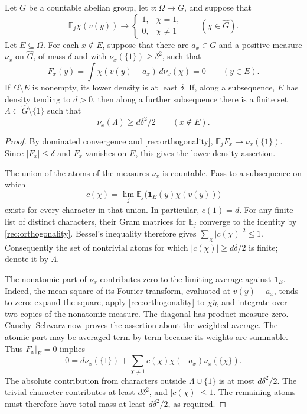 \begin{lemma}\label{rec:spectral-concentration}
Let \(G\) be a countable abelian group, let \(v:\Omega\to G\), and suppose
that
\begin{equation}\label{rec:orthogonality}
 \mathbb E_j\chi(v(y))\longrightarrow
 \begin{cases}1,&\chi=1,\\0,&\chi\ne1\end{cases}
 \qquad(\chi\in\widehat G).
\end{equation}
Let \(E\subseteq\Omega\).  For each \(x\notin E\), suppose that there are
\(a_x\in G\) and a positive measure \(\nu_x\) on \(\widehat G\), of mass
\(\delta\) and with \(\nu_x(\{1\})\geq\delta^2\), such that
\[
 F_x(y)=\int\chi(v(y)-a_x)\,d\nu_x(\chi)=0
 \qquad(y\in E).
\]
If \(\Omega\setminus E\) is nonempty, its lower density is at least
\(\delta\).  If, along a subsequence, \(E\) has density tending to
\(d>0\), then along a further subsequence there is a finite set
\(\Lambda\subset\widehat G\setminus\{1\}\) such that
\begin{equation}\label{rec:finite-spectral-list}
 \nu_x(\Lambda)\geq d\delta^2/2\qquad(x\notin E).
\end{equation}
\end{lemma}

\begin{proof}
By dominated convergence and \eqref{rec:orthogonality},
\(\mathbb E_jF_x\to\nu_x(\{1\})\).  Since \(|F_x|\leq\delta\) and
\(F_x\) vanishes on \(E\), this gives the lower-density assertion.

The union of the atoms of the measures \(\nu_x\) is countable.  Pass to
a subsequence on which
\[
 c(\chi)=\lim_j\mathbb E_j
       \bigl(\boldsymbol 1_E(y)\chi(v(y))\bigr)
\]
exists for every character in that union.  In particular, \(c(1)=d\).
For any finite list of distinct characters, their Gram matrices for
\(\mathbb E_j\) converge to the identity by
\eqref{rec:orthogonality}.  Bessel's inequality therefore gives
\(\sum_\chi|c(\chi)|^2\leq1\).  Consequently the set of nontrivial atoms
for which \(|c(\chi)|\geq d\delta/2\) is finite; denote it by
\(\Lambda\).

The nonatomic part of \(\nu_x\) contributes zero to the limiting average
against \(\boldsymbol 1_E\).  Indeed, the mean square of its Fourier
transform, evaluated at \(v(y)-a_x\), tends to zero: expand the square,
apply \eqref{rec:orthogonality} to \(\chi\overline\eta\), and integrate
over two copies of the nonatomic measure.  The diagonal has product
measure zero.  Cauchy--Schwarz now proves the assertion about the weighted
average.  The atomic part may be averaged term by term because its
weights are summable.  Thus \(F_x|_E=0\) implies
\[
 0=d\nu_x(\{1\})+
   \sum_{\chi\ne1}c(\chi)\chi(-a_x)\nu_x(\{\chi\}).
\]
The absolute contribution from characters outside \(\Lambda\cup\{1\}\)
is at most \(d\delta^2/2\).  The trivial character contributes at least
\(d\delta^2\), and \(|c(\chi)|\leq1\).  The remaining atoms must
therefore have total mass at least \(d\delta^2/2\), as required.
\end{proof}

